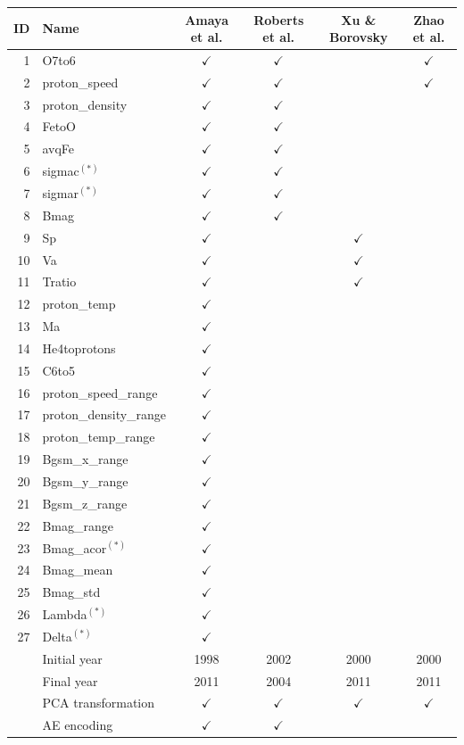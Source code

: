 \documentclass[utf8]{frontiersSCNS} %
\begin{document}
\begin{table}\centering
	\begin{tabular}{@{}rlcccc@{}}
		\toprule
		ID & Name  & Amaya et al. & Roberts et al. & Xu \& Borovsky & Zhao et al. \\
		\midrule
		1 & O7to6 & $\checkmark$ & $\checkmark$ & & $\checkmark$ \\
		2 & proton\_speed & $\checkmark$ & $\checkmark$ & & $\checkmark$ \\
		3 & proton\_density & $\checkmark$ & $\checkmark$ & & \\
		4 & FetoO & $\checkmark$ & $\checkmark$ & & \\
		5 & avqFe & $\checkmark$ & $\checkmark$ & & \\
		6 & sigmac$^{(*)}$ & $\checkmark$ & $\checkmark$ & & \\
		7 & sigmar$^{(*)}$ & $\checkmark$ & $\checkmark$ & & \\
		8 & Bmag & $\checkmark$ & $\checkmark$ & & \\
		9 & Sp & $\checkmark$ & & $\checkmark$ & \\
		10 & Va & $\checkmark$ & &$\checkmark$ & \\
		11 & Tratio & $\checkmark$ & & $\checkmark$ & \\
		12 & proton\_temp & $\checkmark$ & & & \\
		13 & Ma & $\checkmark$ & & & \\
		14 & He4toprotons & $\checkmark$ & & & \\
		15 & C6to5 & $\checkmark$ & & & \\
		16 & proton\_speed\_range & $\checkmark$ & & & \\
		17 & proton\_density\_range & $\checkmark$ & & & \\
		18 & proton\_temp\_range & $\checkmark$ & & & \\
		19 & Bgsm\_x\_range & $\checkmark$ & & & \\
		20 & Bgsm\_y\_range & $\checkmark$ & & & \\
		21 & Bgsm\_z\_range & $\checkmark$ & & & \\
		22 & Bmag\_range & $\checkmark$ & & & \\
		23 & Bmag\_acor$^{(*)}$ & $\checkmark$ & & & \\
		24 & Bmag\_mean & $\checkmark$ & & & \\
		25 & Bmag\_std & $\checkmark$ & & & \\
		26 & Lambda$^{(*)}$ & $\checkmark$ & & & \\
		27 & Delta$^{(*)}$ & $\checkmark$ & & & \\
		\midrule
		 & Initial year & 1998 & 2002 & 2000 & 2000 \\
		 & Final year & 2011 & 2004 & 2011 & 2011 \\
		 & PCA transformation & $\checkmark$ & $\checkmark$ & $\checkmark$ & $\checkmark$ \\
		 & AE encoding & $\checkmark$ & $\checkmark$ & & \\
		\bottomrule
	\end{tabular}
\end{table}
\end{document}

